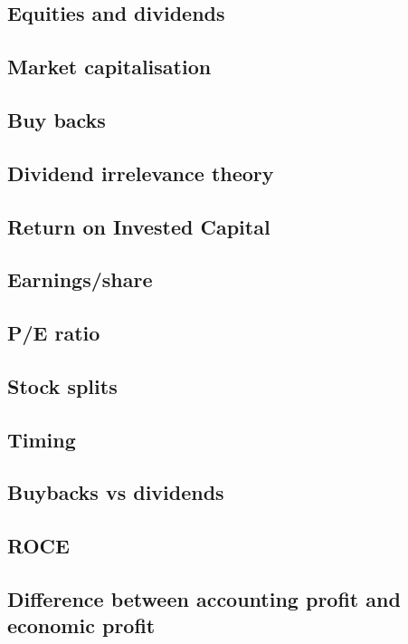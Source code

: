 
\subsection{Equities and dividends}

\subsection{Market capitalisation}

\subsection{Buy backs}

\subsection{Dividend irrelevance theory}

\subsection{Return on Invested Capital}

\subsection{Earnings/share}

\subsection{P/E ratio}

\subsection{Stock splits}

\subsection{Timing}

\subsection{Buybacks vs dividends}

\subsection{ROCE}

\subsection{Difference between accounting profit and economic profit}

